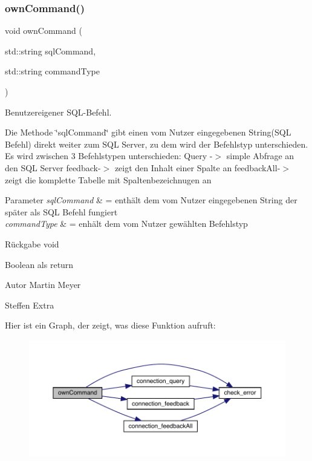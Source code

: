 \subsubsection{own\+Command()}
{\footnotesize\ttfamily void own\+Command (\begin{DoxyParamCaption}\item[{std\+::string}]{sql\+Command,  }\item[{std\+::string}]{command\+Type }\end{DoxyParamCaption})}



Benutzereigener S\+Q\+L-\/\+Befehl. 

Die Methode \char`\"{}sql\+Command\char`\"{} gibt einen vom Nutzer eingegebenen String(\+S\+Q\+L Befehl) direkt weiter zum S\+QL Server, zu dem wird der Befehlstyp unterschieden. Es wird zwischen 3 Befehlstypen unterschieden\+: Query -\/$>$ simple Abfrage an den S\+QL Server feedback-\/$>$ zeigt den Inhalt einer Spalte an feedback\+All-\/$>$ zeigt die komplette Tabelle mit Spaltenbezeichnugen an


\begin{DoxyParams}{Parameter}
{\em sql\+Command} & = enthält dem vom Nutzer eingegebenen String der später als S\+QL Befehl fungiert \\
\hline
{\em command\+Type} & = enhält dem vom Nutzer gewählten Befehlstyp\\
\hline
\end{DoxyParams}
\begin{DoxyReturn}{Rückgabe}
void
\end{DoxyReturn}
Boolean als return \begin{DoxyAuthor}{Autor}
Martin Meyer 

Steffen Extra 
\end{DoxyAuthor}
Hier ist ein Graph, der zeigt, was diese Funktion aufruft\+:\nopagebreak
\begin{figure}[H]
\begin{center}
\leavevmode
\includegraphics[width=350pt]{selection_request_8cpp_a1909c1b8666cf6e3d31a014c9a9ad2d7_cgraph}
\end{center}
\end{figure}
\mbox{\label{selection_request_8cpp_a01bd0062142a17ad04b7101bac7b38b6}} 
